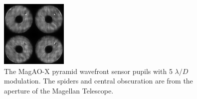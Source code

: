 \begin{figure}
    \centering
    \includegraphics{Chapter Materials/Chapter Three Materials/MagAOXpupil5LD.png}
    \caption{The MagAO-X pyramid wavefront sensor pupils with 5 $\lambda/D$ modulation. The spiders and central obscuration are from the aperture of the Magellan Telescope.  }
    \label{fig:MagAOXpupils}
\end{figure}